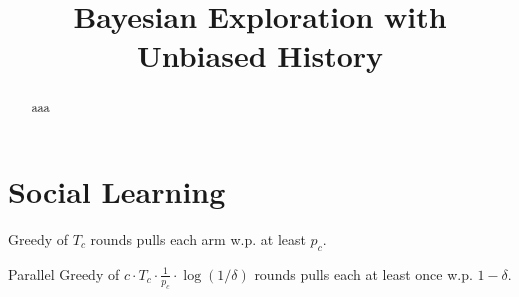\documentclass[11pt]{article}
\title{Bayesian Exploration with Unbiased History}
\author{
}
\def\ALGG{Greedy }
\def\ALGPG{Parallel Greedy }
\begin{document}
\begin{titlepage}
\maketitle

\thispagestyle{empty}
\begin{abstract}
aaa
\end{abstract}
\end{titlepage}




\section{Social Learning}
\begin{lemma}
\ALGG of $T_c$ rounds pulls each arm w.p. at least $p_c$. 
\end{lemma}


\begin{corollary}
\ALGPG of $c \cdot T_c \cdot \frac{1}{p_c} \cdot \log(1/\delta)$ rounds pulls each at least once w.p. $1-\delta$. 
\end{corollary}






\appendix


\end{document}
